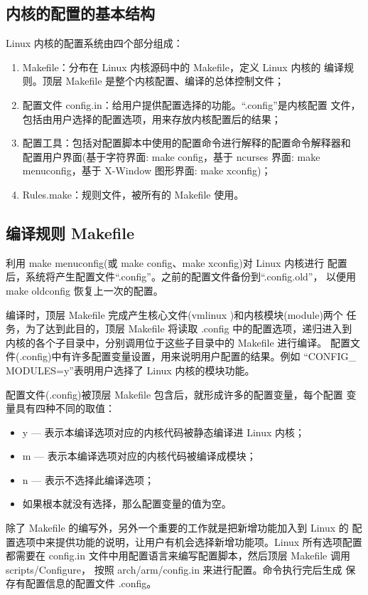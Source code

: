 \subsection{内核的配置的基本结构}
	Linux 内核的配置系统由四个部分组成：
\begin{enumerate}
  \item Makefile：分布在 Linux 内核源码中的 Makefile，定义 Linux 内核的
		编译规则。顶层 Makefile 是整个内核配置、编译的总体控制文件；
  \item 配置文件 config.in：给用户提供配置选择的功能。``.config''是内核配置
		文件，包括由用户选择的配置选项，用来存放内核配置后的结果；
  \item 配置工具：包括对配置脚本中使用的配置命令进行解释的配置命令解释器和
		配置用户界面(基于字符界面: make config，基于 ncurses 界面: make 
		menuconfig，基于 X-Window 图形界面: make xconfig)；
  \item Rules.make：规则文件，被所有的 Makefile 使用。
\end{enumerate}
\subsection{编译规则 Makefile}
	利用 make menuconfig(或 make config、make xconfig)对 Linux 内核进行
配置后，系统将产生配置文件``.config''。之前的配置文件备份到``.config.old''，
以便用 make oldconfig 恢复上一次的配置。

	编译时，顶层 Makefile 完成产生核心文件(vmlinux )和内核模块(module)两个
任务，为了达到此目的，顶层 Makefile 将读取 .config 中的配置选项，递归进入到
内核的各个子目录中，分别调用位于这些子目录中的 Makefile 进行编译。
配置文件(.config)中有许多配置变量设置，用来说明用户配置的结果。例如
``CONFIG\_ MODULES=y''表明用户选择了 Linux 内核的模块功能。

	配置文件(.config)被顶层 Makefile 包含后，就形成许多的配置变量，每个配置
变量具有四种不同的取值：
\begin{itemize}
  \item y --- 表示本编译选项对应的内核代码被静态编译进 Linux 内核；
  \item m --- 表示本编译选项对应的内核代码被编译成模块；
  \item n --- 表示不选择此编译选项；
  \item 如果根本就没有选择，那么配置变量的值为空。
\end{itemize}

	除了 Makefile 的编写外，另外一个重要的工作就是把新增功能加入到 Linux 的
配置选项中来提供功能的说明，让用户有机会选择新增功能项。Linux 所有选项配置
都需要在 config.in 文件中用配置语言来编写配置脚本，然后顶层 Makefile 调用
scripts/Configure， 按照 arch/arm/config.in 来进行配置。命令执行完后生成
保存有配置信息的配置文件 .config。

